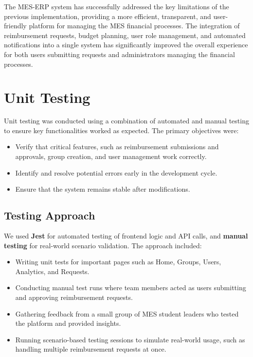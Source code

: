 \documentclass[12pt, titlepage]{article}
\begin{document}
The MES-ERP system has successfully addressed the key limitations of the previous implementation, providing a more efficient, transparent, and user-friendly platform for managing the MES financial processes. The integration of reimbursement requests, budget planning, user role management, and automated notifications into a single system has significantly improved the overall experience for both users submitting requests and administrators managing the financial processes.

\section{Unit Testing}

Unit testing was conducted using a combination of automated and manual testing to ensure key functionalities worked as expected. The primary objectives were:

\begin{itemize}
    \item Verify that critical features, such as reimbursement submissions and approvals, group creation, and user management work correctly.
    \item Identify and resolve potential errors early in the development cycle.
    \item Ensure that the system remains stable after modifications.
\end{itemize}

\subsection{Testing Approach}
We used \textbf{Jest} for automated testing of frontend logic and API calls, and \textbf{manual testing} for real-world scenario validation. The approach included:

\begin{itemize}
    \item Writing unit tests for important pages such as Home, Groups, Users, Analytics, and Requests.
    \item Conducting manual test runs where team members acted as users submitting and approving reimbursement requests.
    \item Gathering feedback from a small group of MES student leaders who tested the platform and provided insights.
    \item Running scenario-based testing sessions to simulate real-world usage, such as handling multiple reimbursement requests at once.
\end{itemize}
\end{document}
